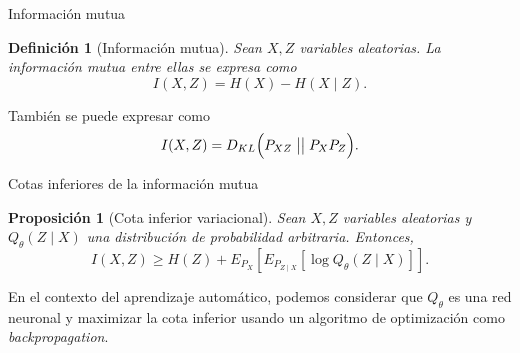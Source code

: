 \documentclass[aspectratio=169]{beamer}
\newcommand\KL[2]{D_{KL}\Big(#1 \bigm|\bigm| #2\Big)}
\newcommand{\X}{\mathcal{X}}
\newtheorem{defi}{Definición}
\newtheorem{prop}{Proposición}
\begin{document}
%
%
%    
%    
%      
%      
%
%

  \begin{frame}{Información mutua}
%
    \begin{defi}[Información mutua]
      Sean \(X,Z\) variables aleatorias. La \emph{información mutua} entre ellas se expresa como
      \[
      I(X,Z) = H(X) - H(X\mid Z).
      \]
      
    \end{defi}
    También se puede expresar como
      \[
      I(X,Z) =  \KL{P_{XZ}}{P_X P_Z}.
      \]
 
  \end{frame}
  \begin{frame}{Cotas inferiores de la información mutua}
  \begin{prop}[Cota inferior variacional]
  Sean \(X,Z\) variables aleatorias y \(Q_\theta (Z\mid X)\) una distribución de probabilidad arbitraria. Entonces,
  \[
  I(X,Z) \geq H(Z) + E_{P_X} \left[ E_{P_{Z \mid X}} \left[ \log Q_\theta(Z \mid X) \right]\right].
  \]
  \end{prop}


  En el contexto del aprendizaje automático, podemos considerar que \(Q_\theta\) es una red neuronal y maximizar la cota inferior usando un algoritmo de optimización como \emph{backpropagation}.
  

\end{frame}
\end{document}
